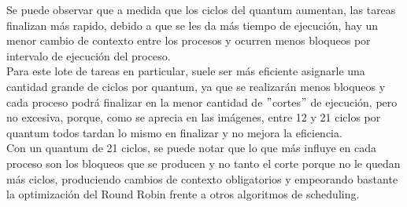 Se puede observar que a medida que los ciclos del quantum aumentan, las tareas finalizan más rapido, debido a que se les da más tiempo de ejecución, hay un menor cambio de contexto entre los procesos y ocurren menos bloqueos por intervalo de ejecución del proceso.
\\
Para este lote de tareas en particular, suele ser más eficiente asignarle una cantidad grande de ciclos por quantum,  ya que se realizarán menos bloqueos y cada proceso podrá finalizar en la menor cantidad de $"$cortes$"$ de ejecución, pero no excesiva, porque, como se aprecia en las imágenes, entre 12 y 21  ciclos por quantum todos tardan lo mismo en finalizar y no mejora la eficiencia.
\\
Con un quantum de 21 ciclos, se puede notar que lo que más influye en cada proceso son los bloqueos que se producen y no tanto el corte porque no le quedan más ciclos, produciendo cambios de contexto obligatorios y empeorando bastante la optimización del Round Robin frente a otros algoritmos de scheduling.


